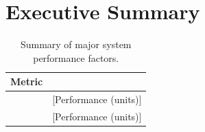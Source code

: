 \documentclass[report]{byu-aero}
\begin{document}


\setcounter{page}{2} %
\thispagestyle{tocpage} %
\tableofcontents %

\clearpage
\newpage

\section{Executive Summary} %
\label{sec:ExecutiveSummary}


\lipsum[1-6]

\begin{table}[h!]
	\centering
	\caption{Summary of major system performance factors.}
	\label{tab:performancesummary}
	\begin{tabular}{ |c|c| } 
		\hline
		\rowcolor{BYUbluemid}
		Metric & \\
		\hline
		& {\color{\BYUred}[Performance (units)]} \\
		\hline
		&  {\color{\BYUred} [Performance (units)]} \\
		\hline
	\end{tabular}
\end{table}

\newpage

\end{document}
